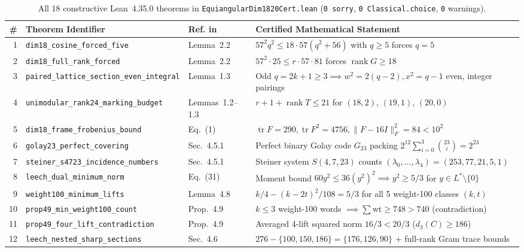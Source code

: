 \documentclass[10pt,twocolumn]{article}
\begin{document}
\begin{table}[tb]
\centering
\caption{All 18 constructive Lean~4.35.0 theorems in \texttt{EquiangularDim1820Cert.lean} (\texttt{0 sorry}, \texttt{0 Classical.choice}, \texttt{0} warnings).}
\label{tab:lean}
\footnotesize
\setlength{\tabcolsep}{4pt}
\begin{tabular}{@{}rllp{6.5cm}@{}}
\toprule
\# & Theorem Identifier & Ref. in~\cite{DLY2026} & Certified Mathematical Statement \\
\midrule
1 & \texttt{dim18\_cosine\_forced\_five} & Lemma~2.2 & $57^2 q^2 \leq 18\cdot 57(q^2+56)$ with $q \geq 5$ forces $q = 5$ \\
2 & \texttt{dim18\_full\_rank\_forced} & Lemma~2.2 & $57^2\cdot 25 \leq r\cdot 57\cdot 81$ forces $\operatorname{rank} G \geq 18$ \\
3 & \texttt{paired\_lattice\_section\_even\_integral} & Lemma~1.3 & Odd $q = 2k+1 \geq 3 \implies w^2 = 2(q-2), x^2 = q-1$ even, integer pairings \\
4 & \texttt{unimodular\_rank24\_marking\_budget} & Lemmas~1.2--1.3 & $r + 1 + \operatorname{rank} T \leq 21$ for $(18,2)$, $(19,1)$, $(20,0)$ \\
5 & \texttt{dim18\_frame\_frobenius\_bound} & Eq.~(1) & $\operatorname{tr} F = 290, \operatorname{tr} F^2 = 4756, \|F-16I\|_F^2 = 84 < 10^2$ \\
6 & \texttt{golay23\_perfect\_covering} & Sec.~4.5.1 & Perfect binary Golay code $G_{23}$ packing $2^{12}\sum_{i=0}^3\binom{23}{i} = 2^{23}$ \\
7 & \texttt{steiner\_s4723\_incidence\_numbers} & Sec.~4.5.1 & Steiner system $S(4,7,23)$ counts $(\lambda_0,\dots,\lambda_4)=(253,77,21,5,1)$ \\
8 & \texttt{leech\_dual\_minimum\_norm} & Eq.~(31) & Moment bound $60 y^2 \leq 36 (y^2)^2 \implies y^2 \geq 5/3$ for $y \in L^*\setminus\{0\}$ \\
9 & \texttt{weight100\_minimum\_lifts} & Lemma~4.8 & $k/4 - (k-2t)^2/108 = 5/3$ for all 5 weight-100 classes $(k,t)$ \\
10 & \texttt{prop49\_min\_weight100\_count} & Prop.~4.9 & $k \leq 3$ weight-100 words $\implies \sum \mathrm{wt} \geq 748 > 740$ (contradiction) \\
11 & \texttt{prop49\_four\_lift\_contradiction} & Prop.~4.9 & Averaged 4-lift squared norm $16/3 < 20/3$ ($d_3(C) \geq 186$) \\
12 & \texttt{leech\_nested\_sharp\_sections} & Sec.~4.6 & $276-\{100,150,186\} = \{176,126,90\}$ + full-rank Gram trace bounds \\

\end{tabular}
\end{table}
\end{document}
